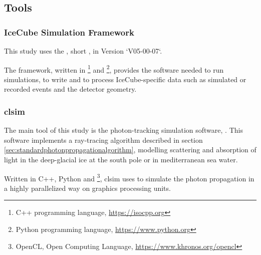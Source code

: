 
\subsection{Tools}

\subsubsection{IceCube Simulation Framework}

This study uses the , short , in Version `V05-00-07`.

The framework, written in \footnote{C++ programming language, \url{https://isocpp.org}} and \footnote{Python programming language, \url{https://www.python.org}}, provides the software needed to run simulations, to write and to process IceCube-specific data such as simulated or recorded events and the detector geometry.





\subsubsection{clsim}

The main tool of this study is the photon-tracking simulation software, . This software implements a ray-tracing algorithm described in section \ref{sec:standardphotonpropagationalgorithm}, modelling scattering and absorption of light in the deep-glacial ice at the south pole or in mediterranean sea water. \cite{clsimreadme}

Written in C++, Python and \footnote{OpenCL, Open Computing Language, \url{https://www.khronos.org/opencl}}, clsim uses  to simulate the photon propagation in a highly parallelized way on graphics processing units.

